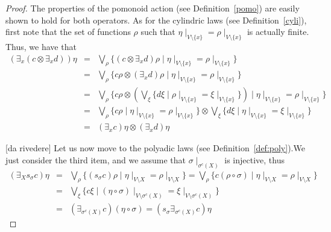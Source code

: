 \documentclass{llncs}
\begin{document}
\begin{proof}
%
The properties of the pomonoid action (see Definition~\ref{pomo})
are easily shown to hold for both operators. 
%
As for the cylindric laws (see Definition~\ref{cyli}), first note that the set of functions 
$\rho$ such that $\eta\mid_{V \setminus \{x\}} = \rho\mid_{V \setminus \{x\}}$ is actually finite.
Thus, we have that 
\begin{eqnarray*}
(\exists_x (c \otimes \exists_x d)) \eta & = & \bigvee_\rho \{(c \otimes \exists_x d) \rho \mid \eta\mid_{V \setminus \{x\}} = \rho\mid_{V \setminus \{x\}}\}\\
& = & \bigvee_\rho \{c\rho \otimes (\exists_x d) \rho \mid \eta\mid_{V \setminus \{x\}} = \rho\mid_{V \setminus \{x\}}\} \\
& = & \bigvee_\rho \{c\rho \otimes  (\bigvee_\xi \{d \xi \mid \rho\mid_{V \setminus \{x\}} = \xi\mid_{V \setminus \{x\}}\}) \mid \eta\mid_{V \setminus \{x\}} = \rho\mid_{V \setminus \{x\}}\} \\
& = & \bigvee_\rho \{c\rho \mid \eta\mid_{V \setminus \{x\}} = \rho\mid_{V \setminus \{x\}}\} \otimes \bigvee_\xi \{d \xi \mid \eta\mid_{V \setminus \{x\}} = \xi\mid_{V \setminus \{x\}}\} \\
& = & (\exists_x c) \eta \otimes (\exists_x d) \eta
\end{eqnarray*}


[da rivedere]
Let us now move to the polyadic laws (see Definition~\ref{def:poly}).We just consider the third item, 
and we assume that $\sigma \mid_{\sigma^c(X)}$ is injective, thus
\begin{eqnarray*}
(\exists_X s_\sigma c) \eta & = &\bigvee_\rho \{(s_\sigma c) \rho \mid \eta\mid_{V \setminus X} = \rho\mid_{V \setminus X}\} = \bigvee_\rho \{c (\rho \circ \sigma) \mid \eta\mid_{V \setminus X} =   \rho\mid_{V \setminus X}\} \\ 
& = & \bigvee_\xi \{c\xi \mid (\eta \circ \sigma)\mid_{V \setminus \sigma^{c}(X)}  =  \xi\mid_{V \setminus \sigma^{c}(X)}\} \\
& = & (\exists_{\sigma^c(X)} c) (\eta \circ \sigma) = (s_\sigma \exists_{\sigma^c(X)} c) \eta
\end{eqnarray*}



\end{proof}
\end{document}
